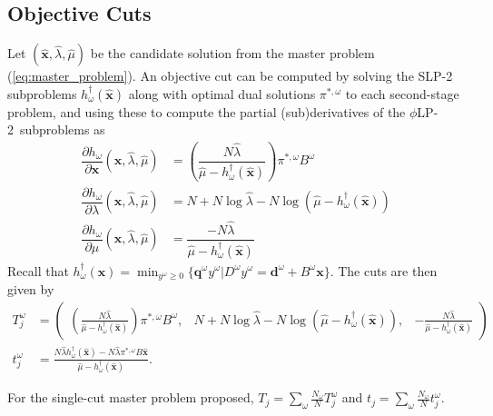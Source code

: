 \documentclass[11pt]{article}
\newcommand{\x}{\mathbf{x}}
\newcommand{\xh}{\hat{\x}}
\newcommand{\lh}{\hat{\lambda}}
\newcommand{\mh}{\hat{\mu}}
\newcommand{\q}{\mathbf{q}}
\renewcommand{\d}{\mathbf{d}}
\newcommand{\plp}{$\phi$LP-2}
\begin{document}
\subsection{Objective Cuts}

Let $(\xh,\lh,\mh)$ be the candidate solution from the master problem (\ref{eq:master_problem}).
An objective cut can be computed by solving the SLP-2 subproblems $h^\dagger_\omega(\xh)$ along with optimal dual solutions $\pi^{*,\omega}$ to each second-stage problem, and using these to compute the partial (sub)derivatives of the \plp\ subproblems as
\begin{align*}
	\dfrac{\partial h_\omega}{\partial \x}(\xh,\lh,\mh) & = \left(\dfrac{N\lh}{\mh - h^\dagger_\omega(\xh)}\right) \pi^{*,\omega} B^\omega \\
	\dfrac{\partial h_\omega}{\partial \lambda}(\xh,\lh,\mh) & = N + N\log\lh - N \log(\mh - h^\dagger_\omega(\xh)) \\
	\dfrac{\partial h_\omega}{\partial \mu}(\xh,\lh,\mh) & = \dfrac{-N\lh}{\mh - h^\dagger_\omega(\xh)}
\end{align*}
Recall that $h^\dagger_\omega(\x) = \min_{y^\omega \geq 0} \{\q^\omega y^\omega | D^\omega y^\omega = \d^\omega + B^\omega \x\}$.
The cuts are then given by
\begin{align*}
	T_j^\omega & = 
	\left( \begin{array}{ccc}
		\left(\frac{N\lh}{\mh - h^\dagger_\omega(\xh)}\right) \pi^{*,\omega} B^\omega, 
			 & N + N\log\lh - N\log(\mh - h^\dagger_\omega(\xh)), 
			 & -\frac{N\lh}{\mh - h^\dagger_\omega(\xh)}
	\end{array} \right) \\
	t_j^\omega & = \frac{N \lh h^\dagger_\omega(\xh) - N \lh \pi^{*,\omega}B\xh}{\mh - h^\dagger_\omega(\xh)}.
\end{align*}

For the single-cut master problem proposed, $T_j = \sum_\omega \frac{N_\omega}{N} T_j^\omega$ and $t_j = \sum_\omega \frac{N_\omega}{N} t_j^\omega$.
\end{document}
